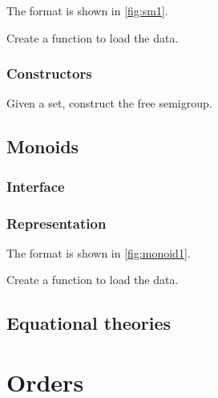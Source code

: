 \begin{exercise}
The format is shown in \cref{fig:sm1}.


\begin{exercise}[Representation]
Create a function to load the data.



\end{exercise}

\subsection*{Constructors}

\begin{exercise}
Given a set, construct the free semigroup.

\end{exercise}


\section{Monoids}

\subsection*{Interface}



\subsection*{Representation}

The format is shown in \cref{fig:monoid1}.



\begin{exercise}[Representation]
Create a function to load the data.


%

\end{exercise}


\section{Equational theories}



\chapter{Orders}



\end{exercise}
